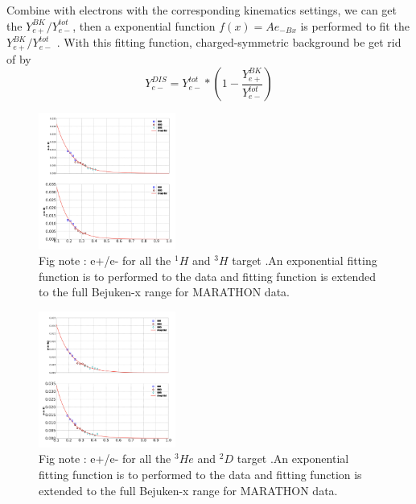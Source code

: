Combine with electrons with the corresponding kinematics settings, we can get the $Y_{e+}^{BK}/Y_{e-}^{tot}$, then a exponential function $f(x)=Ae_{-Bx}$ is performed to fit the $Y_{e+}^{BK}/Y_{e-}^{tot}$ . With this fitting function, charged-symmetric background be get rid of by 
\begin{equation}\label{postiron_eq1}
Y_{e-}^{DIS}=Y_{e-}^{tot}*\left(1-\dfrac{Y_{e+}^{BK}}{Y_{e-}^{tot}}\right)
\end{equation}  
\begin{figure}
 	\begin{center}
 		\includegraphics[width=0.4\textwidth] {./Positron_plot/Positron_2.png}
 		\caption{ Fig note : e+/e- for all the $^{1}H$ and $^{3}H$  target .An exponential fitting function is to performed to the data and fitting function is extended to the full Bejuken-x range for MARATHON data. } \label{po_2}
 	\end{center}
\end{figure}   
  
\begin{figure}
 	\begin{center}
 		\includegraphics[width=0.4\textwidth] {./Positron_plot/Positron_3.png}
 		\caption{ Fig note : e+/e- for all the $^{3}He$ and $^{2}D$  target .An exponential fitting function is to performed to the data and fitting function is extended to the full Bejuken-x range for MARATHON data. } \label{po_3}
 	\end{center}
\end{figure}  


